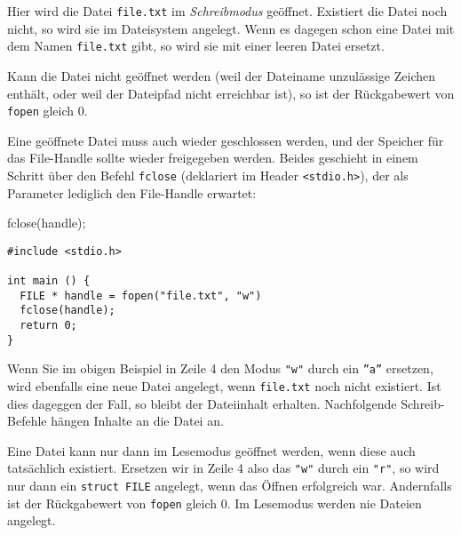 Hier wird die Datei \texttt{file.txt} im \emph{Schreibmodus} geöffnet. Existiert die Datei noch nicht, so wird sie im Dateisystem angelegt. Wenn es dagegen schon eine Datei mit dem Namen \texttt{file.txt} gibt, so wird sie mit einer leeren Datei ersetzt.

Kann die Datei nicht geöffnet werden (\eg weil der Dateiname unzulässige Zeichen enthält, oder weil der Dateipfad nicht erreichbar ist), so ist der Rückgabewert von \texttt{fopen} gleich 0.

Eine geöffnete Datei muss auch wieder geschlossen werden, und der Speicher für das File-Handle sollte wieder freigegeben werden. Beides geschieht in einem Schritt über den Befehl \texttt{fclose} (deklariert im Header \texttt{<stdio.h>}), der als Parameter lediglich den File-Handle erwartet:

\begin{codebox}
fclose(handle);
\end{codebox}

\begin{codebox}
\begin{verbatim}
#include <stdio.h>

int main () {
  FILE * handle = fopen("file.txt", "w")
  fclose(handle);
  return 0;
}
\end{verbatim}
\end{codebox}

Wenn Sie im obigen Beispiel in Zeile 4 den Modus \texttt{"w"} durch ein \texttt{''a''} ersetzen, wird ebenfalls eine neue Datei angelegt, wenn \texttt{file.txt} noch nicht existiert. Ist dies dageggen der Fall, so bleibt der Dateiinhalt erhalten. Nachfolgende Schreib-Befehle hängen Inhalte an die Datei an.

Eine Datei kann nur dann im Lesemodus geöffnet werden, wenn diese auch tatsächlich existiert. Ersetzen wir in Zeile 4 also das \texttt{"w"} durch ein \texttt{"r"}, so wird nur dann ein 
\texttt{struct FILE} angelegt, wenn das Öffnen erfolgreich war. Andernfalls ist der Rückgabewert von \texttt{fopen} gleich 0. Im Lesemodus werden nie Dateien angelegt.

